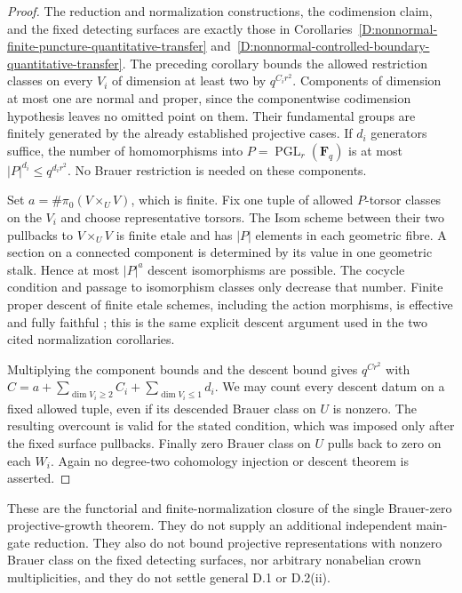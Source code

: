 \begin{proof}
The reduction and normalization constructions, the codimension
claim, and the fixed detecting surfaces are exactly those in
Corollaries~\ref{D:nonnormal-finite-puncture-quantitative-transfer}
and~\ref{D:nonnormal-controlled-boundary-quantitative-transfer}.
The preceding corollary bounds the allowed restriction classes
on every $V_i$ of dimension at least two by $q^{C_i r^2}$.
Components of dimension at most one are normal and proper,
since the componentwise codimension hypothesis leaves no
omitted point on them. Their fundamental groups are finitely
generated by the already established projective cases.
If $d_i$ generators suffice, the number of homomorphisms into
$P=\operatorname{PGL}_r(\mathbf F_q)$ is at most
$|P|^{d_i}\le q^{d_i r^2}$. No Brauer restriction is needed on
these components.

Set $a=\#\pi_0(V\times_U V)$, which is finite. Fix one tuple of
allowed $P$-torsor classes on the $V_i$ and choose representative
torsors. The Isom scheme between their two pullbacks to
$V\times_U V$ is finite etale and has $|P|$ elements in each
geometric fibre. A section on a connected component is determined
by its value in one geometric stalk. Hence at most $|P|^a$
descent isomorphisms are possible. The cocycle condition and
passage to isomorphism classes only decrease that number.
Finite proper descent of finite etale schemes, including the
action morphisms, is effective and fully faithful
\citep[Expose IX, Theorem~4.7]{C_SGA1}; this is the same explicit
descent argument used in the two cited normalization corollaries.

Multiplying the component bounds and the descent bound gives
$q^{Cr^2}$ with
$C=a+\sum_{\dim V_i\ge2}C_i+\sum_{\dim V_i\le1}d_i$.
We may count every descent datum on a fixed allowed tuple, even
if its descended Brauer class on $U$ is nonzero. The resulting
overcount is valid for the stated condition, which was imposed
only after the fixed surface pullbacks. Finally zero Brauer class
on $U$ pulls back to zero on each $W_i$. Again no degree-two
cohomology injection or descent theorem is asserted.
\end{proof}

\begin{remark}
These are the functorial and finite-normalization closure of the
single Brauer-zero projective-growth theorem. They do not supply
an additional independent main-gate reduction. They also do not
bound projective representations with nonzero Brauer class on
the fixed detecting surfaces, nor arbitrary nonabelian crown
multiplicities, and they do not settle general D.1 or D.2(ii).
\end{remark}
